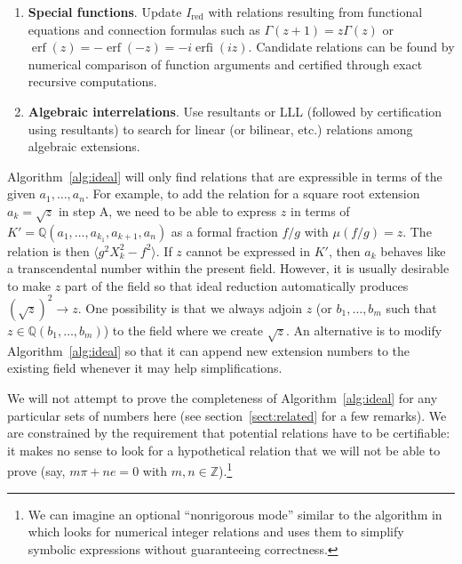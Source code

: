 \documentclass[11pt,a4paper]{article}
\begin{document}
\begin{algorithm}
\begin{enumerate}[{A}]
\item \textbf{Special functions}. Update $I_{\text{red}}$ with relations
resulting
from functional equations and connection formulas such as $\Gamma(z+1) = z \Gamma(z)$
or $\operatorname{erf}(z) = -\operatorname{erf}(-z) = -i \operatorname{erfi}(i z)$.
Candidate relations can be found by numerical comparison of function arguments
and certified through exact recursive computations.

\item \textbf{Algebraic interrelations}. Use resultants or LLL (followed by certification
using resultants) to search for linear (or bilinear, etc.) relations
among algebraic extensions.

\end{enumerate}

\label{alg:ideal}
\end{algorithm}

Algorithm~\ref{alg:ideal} will only find relations
that are expressible in terms of the given
$a_1,\ldots,a_n$.
For example, to add the relation
for a square root extension $a_k = \sqrt{z}$ in step A,
we need to be able to express $z$ in terms
of $K' = \mathbb{Q}(a_1,\ldots,a_{k_1},a_{k+1},a_n)$
as a formal fraction $f/g$ with $\mu(f / g) = z$.
The relation is then $\langle g^2 X_k^2 - f^2 \rangle$.
If $z$ cannot be expressed in $K'$, then $a_k$
behaves like a transcendental number within the present field.
However, it is usually desirable to make $z$ part of the field
so that ideal reduction automatically produces $(\sqrt{z})^2 \rightarrow z$.
One possibility is that we always adjoin $z$ (or $b_1,\ldots,b_m$
such that $z \in \mathbb{Q}(b_1,\ldots,b_m)$) to the field
where we create $\sqrt{z}$.
An alternative is to modify Algorithm~\ref{alg:ideal} so that it
can append new extension numbers to the existing field
whenever it may help simplifications.


We will not attempt to prove the completeness of
Algorithm~\ref{alg:ideal} for any particular sets of numbers here
(see section~\ref{sect:related} for a few remarks).
We are constrained by the requirement
that potential relations have to be certifiable:
it makes no sense to look for a hypothetical relation that we will
not be able to prove (say, $m \pi + n e = 0$ with $m, n \in \mathbb{Z}$).\footnote{We can imagine an optional ``nonrigorous mode''
similar to the algorithm in \cite{BBK2014} which looks for
numerical integer relations and uses them to simplify
symbolic expressions without guaranteeing correctness.}
\end{document}
